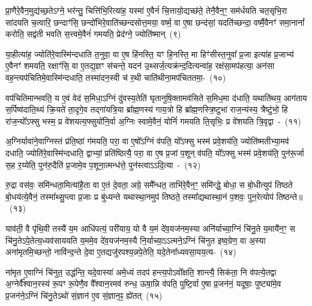 प्रा॒णैरे॒वैन॒मुद्य॑च्छ॒ते\-ऽग्ने॒ भर॑न्तु॒ चित्ति॑भि॒रित्या॑ह॒ यस्मा॑ ए॒वैनं॑ चि॒त्तायो॒द्यच्छ॑ते॒ तेनै॒वैन॒ꣳ॒ सम॑र्धयति चत॒सृभि॒रा सा॑दयति च॒त्वारि॒ छन्दाꣳ॑सि॒ छन्दो॑भिरे॒वाति॑च्छन्दसोत्त॒मया॒ वर्ष्म॒ वा ए॒षा छन्द॑सां॒ यदति॑च्छन्दा॒ वर्ष्मै॒वैनꣳ॑ समा॒नानां᳚ करोति॒ सद्व॑ती भवति स॒त्त्वमे॒वैनं॑ गमयति॒ प्रेद॑ग्ने॒ ज्योति॑ष्मान्~(९)\ip

या॒हीत्या॑ह॒ ज्योति॑रे॒वास्मि॑न्दधाति त॒नुवा॒ वा ए॒ष हि॑नस्ति॒ यꣳ हि॒नस्ति॒ मा हिꣳ॑सीस्त॒नुवा᳚ प्र॒जा इत्या॑ह प्र॒जाभ्य॑ ए॒वैनꣳ॑ शमयति॒ रक्षाꣳ॑सि॒ वा ए॒तद्य॒ज्ञꣳ स॑चन्ते॒ यदन॑ उ॒थ्सर्ज॒त्यक्र॑न्द॒दित्यन्वा॑ह॒ रक्ष॑सा॒मप॑हत्या॒ अन॑सा वह॒न्त्यप॑चितिमे॒वास्मि॑न्दधाति॒ तस्मा॑दन॒स्वी च॑ र॒थी चाति॑थीना॒मप॑चिततमा॒-~(१०)\ip

वप॑चितिमान्भवति॒ य ए॒वं वेद॑ स॒मिधा॒\-ऽग्निं दु॑वस्य॒तेति॑ घृतानुषि॒क्तामव॑सिते स॒मिध॒मा द॑धाति॒ यथाति॑थय॒ आग॑ताय स॒र्पिष्व॑दाति॒थ्यं क्रि॒यते॑ ता॒दृगे॒व तद्गा॑यत्रि॒या ब्रा᳚ह्म॒णस्य॑ गाय॒त्रो हि ब्रा᳚ह्म॒णस्त्रि॒ष्टुभा॑ राज॒न्य॑स्य॒ त्रैष्टु॑भो॒ हि रा॑ज॒न्यो᳚\-ऽफ्सु भस्म॒ प्र वे॑शयत्य॒फ्सुयो॑नि॒र्वा अ॒ग्निः स्वामे॒वैनं॒ योनिं॑ गमयति ति॒सृभिः॒ प्र वे॑शयति त्रि॒वृद्वा~-~(११)\ip

अ॒ग्निर्यावा॑ने॒वाग्निस्तं प्र॑ति॒ष्ठां ग॑मयति॒ परा॒ वा ए॒षो᳚\-ऽग्निं व॑पति॒ यो᳚\-ऽफ्सु भस्म॑ प्रवे॒शय॑ति॒ ज्योति॑ष्मतीभ्या॒मव॑ दधाति॒ ज्योति॑रे॒वास्मि॑न्दधाति॒ द्वाभ्यां॒ प्रति॑ष्ठित्यै॒ परा॒ वा ए॒ष प्र॒जां प॒शून् व॑पति॒ यो᳚\-ऽफ्सु भस्म॑ प्रवे॒शय॑ति॒ पुन॑रू॒र्जा स॒ह र॒य्येति॒ पुन॑रु॒दैति॑ प्र॒जामे॒व प॒शूना॒त्मन्ध॑त्ते॒ पुन॑स्त्वाऽऽदि॒त्या~-~(१२)\ip

रु॒द्रा वस॑वः॒ समि॑न्धता॒मित्या॑है॒ता वा ए॒तं दे॒वता॒ अग्रे॒ समै᳚न्धत॒ ताभि॑रे॒वैन॒ꣳ॒ समि॑न्द्धे॒ बोधा॒ स बो॒धीत्युप॑ तिष्ठते बो॒धय॑त्ये॒वैनं॒ तस्मा᳚थ्सु॒प्त्वा प्र॒जाः प्र बु॑ध्यन्ते यथास्था॒नमुप॑ तिष्ठते॒ तस्मा᳚द्\-यथास्था॒नं प॒शवः॒ पुन॒रेत्योप॑ तिष्ठन्ते॥~(१३)\ip

{}

याव॑ती॒ वै पृ॑थि॒वी तस्यै॑ य॒म आधि॑पत्यं॒ परी॑याय॒ यो वै य॒मं दे॑व॒यज॑नम॒स्या अनि॑र्याच्या॒ग्निं चि॑नु॒ते य॒मायै॑न॒ꣳ॒ स चि॑नु॒ते\-ऽपे॒तेत्य॒ध्यव॑साययति य॒ममे॒व दे॑व॒यज॑नम॒स्यै नि॒र्याच्या॒\-ऽऽ\-त्मने॒\-ऽग्निं चि॑नुत इष्व॒ग्रेण॒ वा अ॒स्या अना॑मृतमि॒च्छन्तो॒ नावि॑न्द॒न्ते दे॒वा ए॒तद्यजु॑रपश्य॒न्नपे॒तेति॒ यदे॒तेना᳚ध्यवसा॒यय॒त्य-~(१४)\ip

ना॑मृत ए॒वाग्निं चि॑नुत॒ उद्ध॑न्ति॒ यदे॒वास्या॑ अमे॒ध्यं तदप॑ हन्त्य॒पो\-ऽवो᳚क्षति॒ शान्त्यै॒ सिक॑ता॒ नि व॑पत्ये॒तद्वा अ॒ग्नेर्वै᳚श्वान॒रस्य॑ रू॒पꣳ रू॒पेणै॒व वै᳚श्वान॒रमव॑ रुन्ध॒ ऊषा॒न्नि व॑पति॒ पुष्टि॒र्वा ए॒षा प्र॒जन॑नं॒ यदूषाः॒ पुष्ट्या॑मे॒व प्र॒जन॑ने॒\-ऽग्निं चि॑नु॒ते\-ऽथो॑ सं॒ज्ञान॑ ए॒व सं॒ज्ञान॒ꣴ॒ ह्ये॑तत्~(१५)\ip

